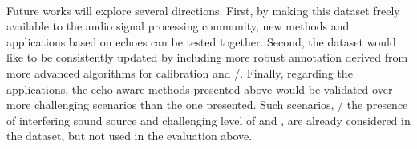 \mynewline
\\Future works will explore several directions.
First, by making this dataset freely available to the audio signal processing community, new methods and applications based on echoes can be tested together.
Second, the dataset would like to be consistently updated by including more robust annotation derived from more advanced algorithms for calibration and \AER/.
Finally, regarding the applications, the echo-aware methods presented above would be validated over more challenging scenarios than the one presented.
Such scenarios, \eg/ the presence of interfering sound source and challenging level of \SNR{} and \RT{}, are already considered in the dataset, but not used in the evaluation above.

